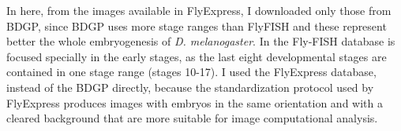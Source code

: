 In here, from the images available in FlyExpress, I downloaded only those from BDGP, since BDGP uses more stage ranges than FlyFISH and these represent better the whole embryogenesis of \textit{D. melanogaster}. In the Fly-FISH database is focused specially in the early stages, as the last eight developmental stages are contained in one stage range (stages 10-17).
I used the FlyExpress database, instead of the BDGP directly, because the standardization protocol used by FlyExpress produces images with embryos in the same orientation and with a cleared background that are more suitable for image computational analysis.


